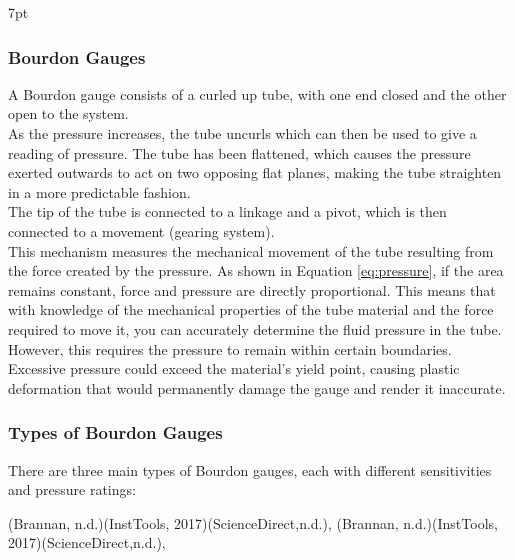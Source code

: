 \documentclass{article}
\newcommand{\formalsource}{} %
\newenvironment{formal}[3][]{%
	\renewcommand{\formalsource}{#1}%
	\def\FrameCommand{%
		\hspace{1pt}%
		{\color{#2}\vrule width 2pt}%
		{\color{#3}\vrule width 4pt}%
		\colorbox{#3}%
	}%
	\MakeFramed{\advance\hsize-\width\FrameRestore}%
	\noindent\hspace{-4.55pt}%
	\begin{adjustwidth}{}{7pt}%
		\vspace{2pt}%
	}%
	{%
		\vspace{4pt}%
		\ifx\formalsource\empty %
		\else
		\hfill{\footnotesize{\formalsource}}%
		\fi
	\end{adjustwidth}\endMakeFramed%
}
\begin{document}
\begin{formal}[(Brannan, n.d.)(InstTools, 2017)(ScienceDirect,n.d.), ]{black!50!white}{white}
\vspace{-1em}
\subsubsection{Bourdon Gauges}	
A Bourdon gauge consists of a curled up tube, with one end closed and the other open to the system.\\[8pt] 
As the pressure increases, the tube uncurls which can then be used to give a reading of pressure. The tube has been flattened, which causes the pressure exerted outwards to act on two opposing flat planes, making the tube straighten in a more predictable fashion.\\[8pt]
The tip of the tube is connected to a linkage and a pivot, which is then connected to a movement (gearing system).\\[8pt]
This mechanism measures the mechanical movement of the tube resulting from the force created by the pressure. As shown in Equation \ref{eq:pressure}, if the area remains constant, force and pressure are directly proportional. This means that with knowledge of the mechanical properties of the tube material and the force required to move it, you can accurately determine the fluid pressure in the tube.\\[8pt] 
However, this requires the pressure to remain within certain boundaries. Excessive pressure could exceed the material's yield point, causing plastic deformation that would permanently damage the gauge and render it inaccurate.\vspace{-0.5em}
\subsubsection*{Types of Bourdon Gauges}
There are three main types of Bourdon gauges, each with different sensitivities and pressure ratings:


\end{formal}
\end{document}
